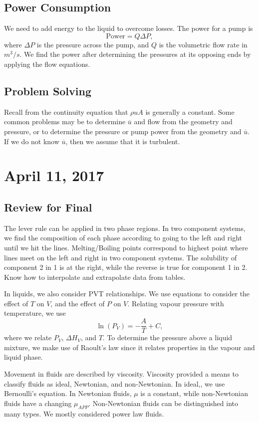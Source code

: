 \documentclass[11pt]{article}
\theoremstyle{plain} %
\theoremstyle{definition}
\theoremstyle{example}
\theoremstyle{remark}
\begin{document}
\subsection{Power Consumption}
We need to add energy to the liquid to overcome losses. The power for a pump is 
$$\text{Power} = Q\Delta P,$$
where $\Delta P$ is the pressure across the pump, and $Q$ is the volumetric flow rate in $m^3/s$. We find the power after determining the pressures at its opposing ends by applying the flow equations. 

\subsection{Problem Solving}
Recall from the continuity equation that $\rho u A$ is generally a constant. Some common problems may be to determine $\overline u$ and flow from the geometry and pressure, or to determine the pressure or pump power from the geometry and $\overline u$. If we do not know $\overline u$, then we assume that it is turbulent. 


\section{April 11, 2017}
\subsection{Review for Final}

The lever rule can be applied in two phase regions. 
In two component systems, we find the composition of each phase according to going to the left and right until we hit the lines. Melting/Boiling points correspond to highest point where lines meet on the left and right in two component systems. The solubility of component 2 in 1 is at the right, while the reverse is true for component 1 in 2. Know how to interpolate and extrapolate data from tables. 

In liquids, we also consider PVT relationships. We use equations to consider the effect of $T$ on $V$, and the effect of $P$ on $V$. Relating vapour pressure with temperature, we use 
$$\ln(P_V) = -\frac{A}{T}+C,$$
where we relate $P_V$, $\Delta H_V$, and $T$. To determine the pressure above a liquid mixture, we make use of Raoult's law since it relates properties in the vapour and liquid phase. 

Movement in fluids are described by viscosity. Viscosity provided a means to classify fluids as ideal, Newtonian, and non-Newtonian. In ideal,, we use Bernoulli's equation. In Newtonian fluids, $\mu$ is a constant, while non-Newtonian fluids have a changing $\mu_{APP}$. Non-Newtonian fluids can be distinguished into many types. We mostly considered power law fluids. 
\end{document}
